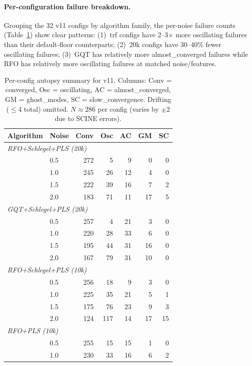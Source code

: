 \documentclass[11pt,a4paper]{article}
\theoremstyle{definition}
\begin{document}
\paragraph{Per-configuration failure breakdown.}
Grouping the 32 v11 configs by algorithm family, the per-noise failure
counts (Table~\ref{tab:per-config-autopsy}) show clear patterns:
(1)~trf configs have 2--3$\times$ more oscillating failures than their
default-floor counterparts; (2)~20k configs have 30--40\% fewer oscillating
failures; (3)~GQT has relatively more almost\_converged failures while
RFO has relatively more oscillating failures at matched noise/features.

\begin{table}[h]
\centering
\caption{Per-config autopsy summary for v11.  Columns: Conv = converged,
  Osc = oscillating, AC = almost\_converged, GM = ghost\_modes,
  SC = slow\_convergence.  Drifting ($\leq$4 total) omitted.
  $N \approx 286$ per config (varies by $\pm$2 due to SCINE errors).}
\label{tab:per-config-autopsy}
\begin{tabular}{llrrrrr}
\toprule
Algorithm & Noise & Conv & Osc & AC & GM & SC \\
\midrule
\multicolumn{7}{l}{\emph{RFO+Schlegel+PLS (20k)}} \\
 & 0.5 & 272 & 5 & 9 & 0 & 0 \\
 & 1.0 & 245 & 26 & 12 & 4 & 0 \\
 & 1.5 & 222 & 39 & 16 & 7 & 2 \\
 & 2.0 & 183 & 71 & 11 & 17 & 5 \\
\midrule
\multicolumn{7}{l}{\emph{GQT+Schlegel+PLS (20k)}} \\
 & 0.5 & 257 & 4 & 21 & 3 & 0 \\
 & 1.0 & 220 & 28 & 33 & 6 & 0 \\
 & 1.5 & 195 & 44 & 31 & 16 & 0 \\
 & 2.0 & 167 & 79 & 31 & 10 & 0 \\
\midrule
\multicolumn{7}{l}{\emph{RFO+Schlegel+PLS (10k)}} \\
 & 0.5 & 256 & 18 & 9 & 3 & 0 \\
 & 1.0 & 225 & 35 & 21 & 5 & 1 \\
 & 1.5 & 175 & 76 & 23 & 9 & 3 \\
 & 2.0 & 124 & 117 & 14 & 17 & 15 \\
\midrule
\multicolumn{7}{l}{\emph{RFO+PLS (10k)}} \\
 & 0.5 & 255 & 15 & 15 & 1 & 0 \\
 & 1.0 & 230 & 33 & 16 & 6 & 2 \\

\end{tabular}
\end{table}
\end{document}
